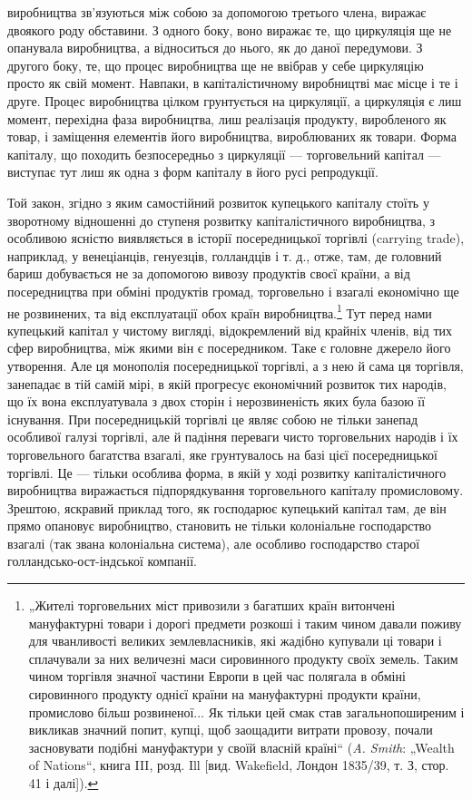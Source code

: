 \parcont{}  %
виробництва зв’язуються між собою за допомогою третього члена,
виражає двоякого роду обставини. З одного боку, воно виражає
те, що циркуляція ще не опанувала виробництва, а відноситься до
нього, як до даної передумови. З другого боку, те, що процес
виробництва ще не ввібрав у себе циркуляцію просто як свій
момент. Навпаки, в капіталістичному виробництві має місце і те
і друге. Процес виробництва цілком грунтується на циркуляції, а
циркуляція є лиш момент, перехідна фаза виробництва, лиш реалізація
продукту, виробленого як товар, і заміщення елементів
його виробництва, вироблюваних як товари. Форма капіталу, що
походить безпосередньо з циркуляції — торговельний капітал —
виступає тут лиш як одна з форм капіталу в його русі репродукції.

Той закон, згідно з яким самостійний розвиток купецького капіталу
стоїть у зворотному відношенні до ступеня розвитку капіталістичного
виробництва, з особливою ясністю виявляється в історії
посередницької торгівлі (carrying trade), наприклад, у венеціанців,
генуезців, голландців і т. д., отже, там, де головний бариш
добувається не за допомогою вивозу продуктів своєї країни,
а від посередництва при обміні продуктів громад, торговельно
і взагалі економічно ще не розвинених, та від експлуатації обох
країн виробництва.\footnote{
„Жителі торговельних міст привозили з багатших країн витончені мануфактурні
товари і дорогі предмети розкоші і таким чином давали поживу для
чванливості великих землевласників, які жадібно купували ці товари і сплачували
за них величезні маси сировинного продукту своїх земель. Таким чином торгівля
значної частини Европи в цей час полягала в обміні сировинного продукту
однієї країни на мануфактурні продукти країни, промислово більш розвиненої...
Як тільки цей смак став загальнопоширеним і викликав значний попит, купці,
щоб заощадити витрати провозу, почали засновувати подібні мануфактури
у своїй власній країні“ (\emph{A. Smith}: „Wealth of Nations“, книга III, розд. Ill [вид.
Wakefield, Лондон 1835/39, т. З, стор. 41 і далі]).
} Тут перед нами купецький капітал у чистому
вигляді, відокремлений від крайніх членів, від тих сфер
виробництва, між якими він є посередником. Таке є головне
джерело його утворення. Але ця монополія посередницької торгівлі,
а з нею й сама ця торгівля, занепадає в тій самій мірі,
в якій прогресує економічний розвиток тих народів, що їх вона
експлуатувала з двох сторін і нерозвиненість яких була базою
її існування. При посередницькій торгівлі це являє собою не
тільки занепад особливої галузі торгівлі, але й падіння переваги
чисто торговельних народів і їх торговельного багатства
взагалі, яке грунтувалось на базі цієї посередницької торгівлі.
Це — тільки особлива форма, в якій у ході розвитку капіталістичного
виробництва виражається підпорядкування торговельного
капіталу промисловому. Зрештою, яскравий приклад
того, як господарює купецький капітал там, де він прямо опановує
виробництво, становить не тільки колоніальне господарство
взагалі (так звана колоніальна система), але особливо господарство
старої голландсько-ост-індської компанії.
